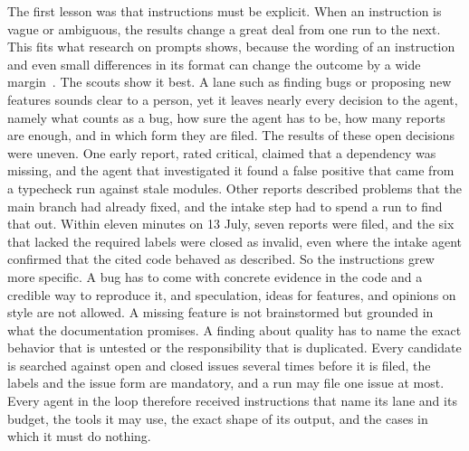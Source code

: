 \documentclass[11pt,a4paper]{article}
\begin{document}
The first lesson was that instructions must be explicit.
When an instruction is vague or ambiguous, the results change a great deal from one run to the
next.
This fits what research on prompts shows, because the wording of an instruction and even small
differences in its format can change the outcome by a wide margin~\cite{zhou2023ape,sclar2024quantifying}.
The scouts show it best.
A lane such as finding bugs or proposing new features sounds clear to a person, yet it leaves
nearly every decision to the agent, namely what counts as a bug, how sure the agent has to be,
how many reports are enough, and in which form they are filed.
The results of these open decisions were uneven.
One early report, rated critical, claimed that a dependency was missing, and the agent that
investigated it found a false positive that came from a typecheck run against stale modules.
Other reports described problems that the main branch had already fixed, and the intake step had
to spend a run to find that out.
Within eleven minutes on 13 July, seven reports were filed, and the six that lacked the required
labels were closed as invalid, even where the intake agent confirmed that the cited code behaved
as described.
So the instructions grew more specific.
A bug has to come with concrete evidence in the code and a credible way to reproduce it, and
speculation, ideas for features, and opinions on style are not allowed.
A missing feature is not brainstormed but grounded in what the documentation promises.
A finding about quality has to name the exact behavior that is untested or the responsibility
that is duplicated.
Every candidate is searched against open and closed issues several times before it is filed, the
labels and the issue form are mandatory, and a run may file one issue at most.
Every agent in the loop therefore received instructions that name its lane and its budget, the
tools it may use, the exact shape of its output, and the cases in which it must do nothing.
\end{document}
